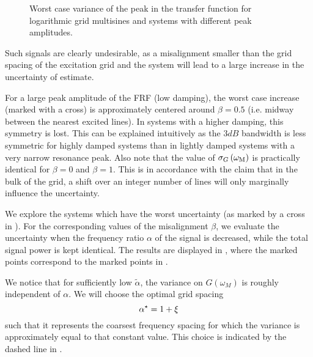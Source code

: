     \begin{figure}
    \vspace{-0.5em} %
    \centering
      \setlength{}
      \setlength\figureheight{0.62\figurewidth}
    
    \caption[Worst-case variance $\sigma_G^2\left( \wM \right)$ as a function of the frequency ratio $\alpha$.]{Worst case variance of the peak in the transfer function for logarithmic grid multisines and systems with different peak amplitudes.}
    \label{fig:excitation:worstCaseAlpha}
  \end{figure}

  Such signals are clearly undesirable, as a misalignment smaller than the grid spacing of the excitation grid and the system will lead to a large increase in the uncertainty of estimate.
  
  For a large peak amplitude of the \gls{FRF} (low damping), the worst case increase (marked with a cross) is approximately centered around $\beta = 0.5$ (i.e. midway between the nearest excited lines).
  In systems with a higher damping, this symmetry is lost.
  This can be explained intuitively as the $3\unit{dB}$ bandwidth is less symmetric for highly damped systems than in lightly damped systems with a very narrow resonance peak.
  Also note that the value of $\sigma_G\left(\omega_{\mathrm{M}} \right)$ is practically identical for $\beta=0$ and $\beta=1$.
  This is in accordance with the claim that in the bulk of the grid, a shift over an integer number of lines will only marginally influence the uncertainty.
  
  We explore the systems which have the worst uncertainty (as marked by a cross in ).
  For the corresponding values of the misalignment $\beta$, we evaluate the uncertainty when the frequency ratio $\alpha$ of the signal is decreased, while the total signal power is kept identical.
  The results are displayed in , where the marked points correspond to the marked points in .

  We notice that for sufficiently low $\tilde{\alpha}$, the variance on $G\left( \omega_M \right)$ is roughly independent of $\alpha$.
  We will choose the optimal grid spacing
  \begin{equation}
    \alpha^{\star} = 1 + \xi_{}
    \label{eq:excitation:optimAlpha}
  \end{equation}
  such that it represents the coarsest frequency spacing for which the variance is approximately equal to that constant value.
  This choice is indicated by the dashed line in .

